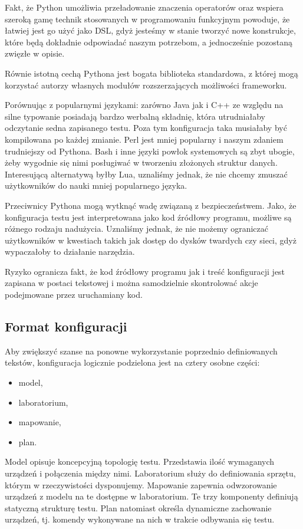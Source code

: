 \documentclass[00-praca-magisterska.tex]{subfiles}
\begin{document}
Fakt, że Python umożliwia przeładowanie znaczenia operatorów oraz wspiera
szeroką gamę technik stosowanych w programowaniu funkcyjnym powoduje, że
łatwiej jest go użyć jako DSL, gdyż jesteśmy w stanie tworzyć nowe konstrukcje,
które będą dokładnie odpowiadać naszym potrzebom, a jednocześnie pozostaną
zwięzłe w opisie.

Równie istotną cechą Pythona jest bogata biblioteka standardowa, z której mogą
korzystać autorzy własnych modułów rozszerzających możliwości frameworku.

Porównując z popularnymi językami: zarówno Java jak i C++ ze względu na
silne typowanie posiadają bardzo werbalną składnię, która utrudniałaby
odczytanie sedna zapisanego testu. Poza tym konfiguracja taka musiałaby być
kompilowana po każdej zmianie. Perl jest mniej popularny i naszym zdaniem
trudniejszy od Pythona. Bash i inne języki powłok systemowych są zbyt ubogie,
żeby wygodnie się nimi posługiwać w tworzeniu złożonych struktur danych.
Interesującą alternatywą byłby Lua, uznaliśmy jednak, że nie chcemy zmuszać
użytkowników do nauki mniej popularnego języka.

Przeciwnicy Pythona mogą wytknąć wadę związaną z bezpieczeństwem. Jako, że
konfiguracja testu jest interpretowana jako kod źródłowy programu, możliwe są
różnego rodzaju nadużycia. Uznaliśmy jednak, że nie możemy ograniczać
użytkowników w kwestiach takich jak dostęp do dysków twardych czy sieci, gdyż
wypaczałoby to działanie narzędzia.

Ryzyko ogranicza fakt, że kod źródłowy programu jak i treść konfiguracji jest
zapisana w postaci tekstowej i można samodzielnie skontrolować akcje
podejmowane przez uruchamiany kod.

\subsection{Format konfiguracji}

Aby zwiększyć szanse na ponowne wykorzystanie poprzednio definiowanych
tekstów, konfiguracja logicznie podzielona jest na cztery osobne części:
\begin{itemize}
\item model,
\item laboratorium,
\item mapowanie,
\item plan.
\end{itemize}

Model opisuje koncepcyjną topologię testu. Przedstawia ilość wymaganych
urządzeń i połączenia między nimi. Laboratorium służy do definiowania sprzętu,
którym w rzeczywistości dysponujemy. Mapowanie zapewnia odwzorowanie urządzeń
z modelu na te dostępne w laboratorium. Te trzy komponenty definiują statyczną
strukturę testu. Plan natomiast określa dynamiczne zachowanie urządzeń, tj.
komendy wykonywane na nich w trakcie odbywania się testu.
\end{document}
